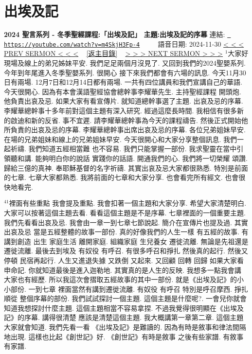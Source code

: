 \documentclass{book}
\begin{document}
\section{出埃及記}
\label{sec:m4SkjH3Fp_4}
\textbf{2024 聖言系列 - 冬季聖經課程:「出埃及記」 主題:出埃及記的序幕}
\newline
\newline
連結: \href{https://youtube.com/watch?v=m4SkjH3Fp-4}{\texttt{ https://youtube.com/watch?v=m4SkjH3Fp-4}} ~~~~ 語音日期: 2024-11-30 
\newline
\newline
\hyperref[sec:code]{\small{< < < PREV SERMON < < <}}
~
\hyperref[sec:index]{\small{[返主目錄]}}
~
\hyperref[sec:dqXyjOETQK4]{\small{> > > NEXT SERMON > > >}}
\newline
\newline
$^{1}$大家好 現場及線上的弟兄姊妹平安.
我們足足兩個月沒見了.
又回到我們的2024聖嬰系列.
今年到年尾進入冬季聖嬰系列.
很開心 接下來我們都會有六場的訊息.
今天11月30日有兩場.
12月7日和12月14日都有兩場.
一共有四位講員和我們宣講自己的華語.
今天很開心.
因為有本會漢語聖經協會總幹事李耀華先生.
主持聖經課程 開頭炮.
他負責出哀及忌.
如果大家有看宣傳片.
就知道總幹事選了主題.
出哀及忌的序幕.
李耀華總幹事十多年前對這個主題有深入研究.
經過這麼長時間.
我相信有很多新的啟迪和新的反省.
事不宜遲.
請李耀華總幹事為今天的課程禱告.
然後正式開始他所負責的出哀及忌的序幕.
李耀華總幹事出席出哀及忌的序幕.
各位兄弟姐妹早安.
在場的兄弟姐妹和線上的兄弟姐妹早安.
今天很開心和大家分享整個訊息.
我們一起祈禱.
我們知道五經相當難 也不容易.
我們只能掌握一部份.
我求聖靈在當中引領聽和講.
能夠明白你的說話 實踐你的話語.
開通我們的心.
我們將一切榮耀 頌讚.
歸給三億的真神.
奉耶穌基督的名字祈禱.
其實出哀及忌大家都很熟悉.
特別是前面的七章.
七章大家都熟悉.
我將前面的七章和大家分享.
也會看完所有經文.
也會很快地看完.

$^{41}$裡面有些重點 我會提及重點.
我會扣著一個主題和大家分享.
希望大家清楚明白.
大家可以按著這個主題去看.
看看這個主題是不是序幕.
七章裡面的一個重要主題.
我們先看看出哀及忌.
我會由一章一到七章七節說起.
簡介在宣傳片也提及過.
其實出哀及忌 當是五經整體的故事一部份.
真的好像我們的人生一樣 有五經的故事.
有講到創造 出生 家庭生活 離開家庭.
組織家庭 生兒養女 遷徙流離.
無論是先祖還是遷徙流離.
最後去到埃及 有奴役 有呼召.
有很多呼召和掙扎 然後真的起行.
然後又停頓 民宿再起行.
人生又進退失據 又跌倒 又起來.
又回顧 回轉 回歸 如果大家看申命記.
你就知道最後是進入迦勒地.
其實真的是人生的反映.
我想多一點我會講 大家也有經歷.
所以我這次會摺取五經故事的其中一部份.
就是《出埃及記》的小小部份.
一到七章 裡面當然有講到遷徙流離.
有奴役 有呼召 特別是呼召摩西.
掙扎 順從 整個序幕的部份.
我們試試探討一個主題.
這個主題是什麼呢?.
一會兒你就會知道我想探討什麼主題.
這個主題相當不容易拿捏.
不過我覺得很明顯在《出埃及記》的序幕.
講得很清楚 應該是清楚這個主題.
我大概講第一章第二章.
這個主題大家就會知道.
我們先看一看 《出埃及記》是難讀的.
因為有時是敘事和律法間隔地出現.
這樣也比起《創世記》好.
《創世記》有時是敘事 之後有些家譜.
有敘事 有家譜.
\end{document}
